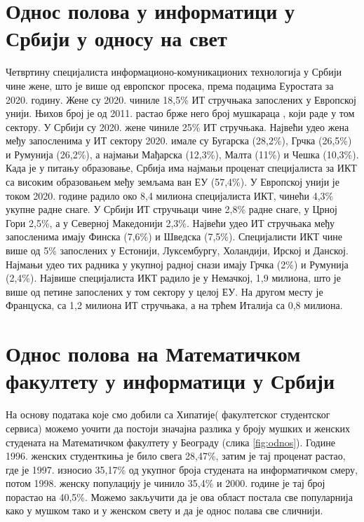 \documentclass[a4paper]{article}
\begin{document}
\section{Однос полова у информатици у Србији у односу на свет}
Четвртину специјалиста информационо-комуникационих технологија у Србији чине жене, што је 
више од европског просека, према подацима Еуростата за 2020. годину. Жене су 2020. чиниле 18,5\% 
ИТ стручњака запослених у Европској унији. Њихов број је од 2011. растао брже него број мушкараца 
, који раде у том сектору. У Србији су 2020. жене чиниле 25\% ИТ стручњака. Највећи удео жена 
међу запосленима у ИТ сектору 2020. имале су Бугарска (28,2\%), Грчка (26,5\%) и Румунија 
(26,2\%), а најмањи Мађарска (12,3\%), Малта (11\%) и Чешка (10,3\%). Када је у 
питању образовање, Србија има најмањи проценат специјалиста за ИКТ са високим образовањем међу 
земљама ван ЕУ (57,4\%). У Европској унији је током 2020. године радило око 8,4 милиона 
специјалиста ИКТ, чинећи 4,3\% укупне радне снаге. У Србији ИТ стручњаци чине 2,8\% радне 
снаге, у Црној Гори 2,5\%, а у Северној Македонији 2,3\%. Највећи удео ИТ стручњака међу 
запосленима имају Финска (7,6\%) и Шведска (7,5\%). Специјалисти ИКТ чине више од 5\% 
запослених у Естонији, Луксембургу, Холандији, Ирској и Данској. Најмањи удео тих радника у 
укупној радној снази имају Грчка (2\%) и Румунија (2,4\%). Највише специјалиста ИКТ 
радило је у Немачкој, 1,9 милиона, што је више од петине запослених у том сектору у целој ЕУ. На 
другом месту је Француска, са 1,2 милиона ИТ стручњака, а на трћем Италија са 0,8 милиона. \cite{danas_it}

\section{Однос полова на Математичком факултету у информатици у Србији}

На основу података које смо добили са Хипатије( факултетског студентског сервиса) можемо уочити да постоји значајна разлика у броју мушких и женских студената на Математичком факултету у Београду (слика \ref{fig:odnos}). Године 1996. женских студенткиња је било свега 28,47\%,  затим је тај проценат растао, где је 1997. износио 35,17\% од укупног броја студената на информатичком смеру, потом 1998. женску популацију је чинило 35,4\% и 2000. године је тај број порастао на 40,5\%. Можемо закључити да је ова област постала све популарнија како у мушком тако и у женском свету и да је однос полава све сличнији. 
\end{document}
